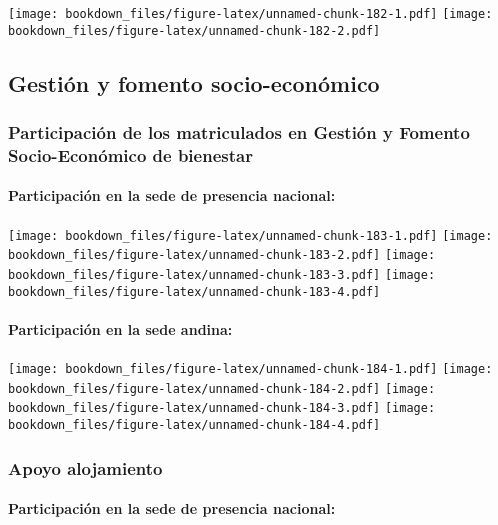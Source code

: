 \documentclass[]{article}
\let\oldparagraph\paragraph
\renewcommand{\paragraph}[1]{\oldparagraph{#1}\mbox{}}
\theoremstyle{definition}
\theoremstyle{definition}
\theoremstyle{definition}
\theoremstyle{remark}
\begin{document}
\texttt{[image: bookdown\_files/figure-latex/unnamed-chunk-182-1.pdf]}
\texttt{[image: bookdown\_files/figure-latex/unnamed-chunk-182-2.pdf]}

\subsection{Gestión y fomento
socio-económico}\label{gestion-y-fomento-socio-economico-1}

\subsubsection{Participación de los matriculados en Gestión y Fomento
Socio-Económico de
bienestar}\label{participacion-de-los-matriculados-en-gestion-y-fomento-socio-economico-de-bienestar-1}

\paragraph{Participación en la sede de presencia
nacional:}\label{participacion-en-la-sede-de-presencia-nacional-8}

\texttt{[image: bookdown\_files/figure-latex/unnamed-chunk-183-1.pdf]}
\texttt{[image: bookdown\_files/figure-latex/unnamed-chunk-183-2.pdf]}
\texttt{[image: bookdown\_files/figure-latex/unnamed-chunk-183-3.pdf]}
\texttt{[image: bookdown\_files/figure-latex/unnamed-chunk-183-4.pdf]}

\paragraph{Participación en la sede
andina:}\label{participacion-en-la-sede-andina-8}

\texttt{[image: bookdown\_files/figure-latex/unnamed-chunk-184-1.pdf]}
\texttt{[image: bookdown\_files/figure-latex/unnamed-chunk-184-2.pdf]}
\texttt{[image: bookdown\_files/figure-latex/unnamed-chunk-184-3.pdf]}
\texttt{[image: bookdown\_files/figure-latex/unnamed-chunk-184-4.pdf]}

\subsubsection{Apoyo alojamiento}\label{apoyo-alojamiento-1}

\paragraph{Participación en la sede de presencia
nacional:}\label{participacion-en-la-sede-de-presencia-nacional-9}
\end{document}
